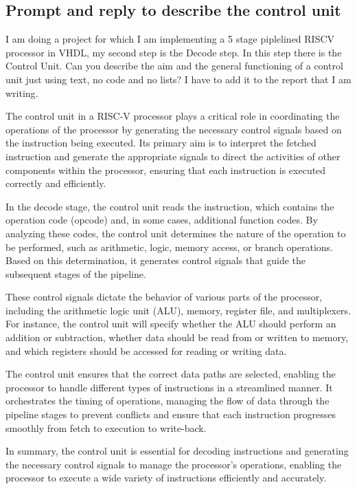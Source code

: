 \documentclass{article}
\begin{document}
\subsection{Prompt and reply to describe the control unit}\label{prompt:regfile}

\begin{itshape}
I am doing a project for which I am implementing a 5 stage piplelined RISCV processor in VHDL, my
second step is the Decode step. In this step there is the Control Unit. Can you describe the aim and
the general functioning of a control unit just using text, no code and no lists? I have to add it to
the report that I am writing.
\end{itshape}

\begin{spverbatim}
The control unit in a RISC-V processor plays a critical role in coordinating the operations of the processor by generating the necessary control signals based on the instruction being executed. Its primary aim is to interpret the fetched instruction and generate the appropriate signals to direct the activities of other components within the processor, ensuring that each instruction is executed correctly and efficiently.

In the decode stage, the control unit reads the instruction, which contains the operation code (opcode) and, in some cases, additional function codes. By analyzing these codes, the control unit determines the nature of the operation to be performed, such as arithmetic, logic, memory access, or branch operations. Based on this determination, it generates control signals that guide the subsequent stages of the pipeline.

These control signals dictate the behavior of various parts of the processor, including the arithmetic logic unit (ALU), memory, register file, and multiplexers. For instance, the control unit will specify whether the ALU should perform an addition or subtraction, whether data should be read from or written to memory, and which registers should be accessed for reading or writing data.

The control unit ensures that the correct data paths are selected, enabling the processor to handle different types of instructions in a streamlined manner. It orchestrates the timing of operations, managing the flow of data through the pipeline stages to prevent conflicts and ensure that each instruction progresses smoothly from fetch to execution to write-back.

In summary, the control unit is essential for decoding instructions and generating the necessary control signals to manage the processor's operations, enabling the processor to execute a wide variety of instructions efficiently and accurately.
\end{spverbatim}

%

\clearpage
\printglossary
\clearpage
\nocite{*}


\end{document}
